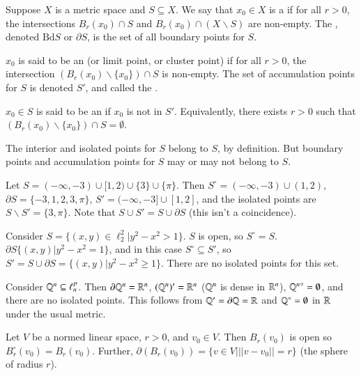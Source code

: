 \begin{defn}
    Suppose $X$ is a metric space and $S \subseteq X$. We say that $x_0 \in X$ is a  if for all $r > 0$, the intersections $B_r(x_0) \cap S$ and $B_r(x_0)\cap (X\backslash S)$ are non-empty. The , denoted $\text{Bd}S$ or $\partial S$, is the set of all boundary points for $S$.

    $x_0$ is said to be an  (or limit point, or cluster point) if for all $r > 0$, the intersection $(B_r(x_0) \backslash \{x_0\})\cap S$ is non-empty. The set of accumulation points for $S$ is denoted $S'$, and called the . 

    $x_0 \in S$ is said to be an  if $x_0$ is not in $S'$. Equivalently, there exists $r > 0$ such that $(B_r(x_0)\backslash\{x_0\})\cap S = \emptyset$.
\end{defn}

The interior and isolated points for $S$ belong to $S$, by definition. But boundary points and accumulation points for $S$ may or may not belong to $S$.

\begin{eg}[Subsets of $\R$]
    Let $S = (-\infty,-3)\cup[1,2)\cup\{3\}\cup\{\pi\}$. Then $S^{\circ} = (-\infty,-3)\cup(1,2)$, $\partial S = \{-3,1,2,3,\pi\}$, $S' = (-\infty,-3]\cup[1,2]$, and the isolated points are $S\backslash S' = \{3,\pi\}$. Note that $S\cup S' = S\cup \partial S$ (this isn't a coincidence).
\end{eg}

\begin{eg}
    Consider $S = \{(x,y) \in \ell_2^2\vert y^2-x^2 > 1\}$. $S$ is open, so $S^{\circ} =S$. $\partial S \{(x,y)\vert y^2-x^2 = 1\}$, and in this case $S^{\circ} \subseteq S'$, so $S' = S \cup \partial S = \{(x,y)\vert y^2-x^2\geq 1\}$. There are no isolated points for this set.
\end{eg}

\begin{eg}
    Consider $\mathbb Q^n \subseteq \ell_n^p$. Then $\partial \mathbb Q^n = \mathbb R^n$, $(\mathbb Q^n)' = \mathbb R^n$ ($\mathbb Q^n$ is dense in $\mathbb R^n$), ${\mathbb Q^n}^{\circ} = \emptyset$, and there are no isolated points. This follows from $\mathbb Q' = \partial \mathbb Q = \mathbb R$ and $\mathbb Q^{\circ}  = \emptyset$ in $\R$ under the usual metric.
\end{eg}

\begin{eg}
    Let $V$ be a normed linear space, $r > 0$, and $v_0 \in V$. Then $B_r(v_0)$ is open so $B_r^{\circ}(v_0) = B_r(v_0)$. Further, $\partial(B_r(v_0)) = \{v \in V\vert ||v-v_0|| = r\}$ (the sphere of radius $r$).
\end{eg}

